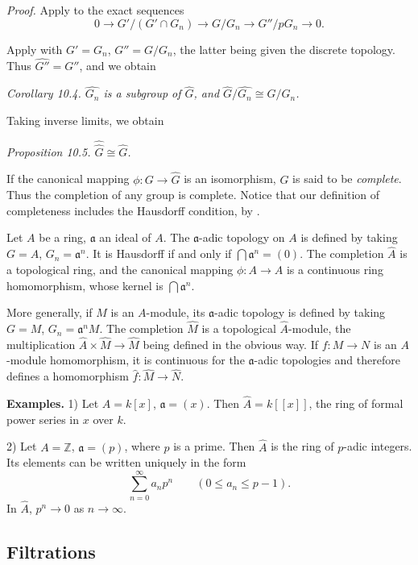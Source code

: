 \noindent\textit{Proof.} Apply  to the exact sequences
\[
0\longrightarrow G'/(G'\cap G_n)\longrightarrow G/G_n\longrightarrow G''/pG_n\longrightarrow0.
\]
\proofbox

Apply  with $G'=G_n$, $G''=G/G_n$, the latter being given the discrete topology. Thus $\widehat{G''}=G''$, and we obtain

\noindent\textit{Corollary 10.4. $\widehat{G_n}$ is a subgroup of $\widehat G$, and $\widehat G/\widehat{G_n}\cong G/G_n$.} \proofbox

Taking inverse limits, we obtain

\noindent\textit{Proposition 10.5. $\widehat{\widehat G}\cong\widehat G$.} \proofbox

If the canonical mapping $\phi:G\longrightarrow\widehat G$ is an isomorphism, $G$ is said to be \textit{complete}. Thus the completion of any group is complete. Notice that our definition of completeness includes the Hausdorff condition, by .

Let $A$ be a ring, $\mathfrak a$ an ideal of $A$. The $\mathfrak a$-adic topology on $A$ is defined by taking $G=A$, $G_n=\mathfrak a^n$. It is Hausdorff if and only if $\bigcap\mathfrak a^n=(0)$. The completion $\widehat A$ is a topological ring, and the canonical mapping $\phi:A\longrightarrow\widehat A$ is a continuous ring homomorphism, whose kernel is $\bigcap\mathfrak a^n$.

More generally, if $M$ is an $A$-module, its $\mathfrak a$-adic topology is defined by taking $G=M$, $G_n=\mathfrak a^nM$. The completion $\widehat M$ is a topological $\widehat A$-module, the multiplication $\widehat A\times\widehat M\longrightarrow\widehat M$ being defined in the obvious way. If $f:M\longrightarrow N$ is an $A$-module homomorphism, it is continuous for the $\mathfrak a$-adic topologies and therefore defines a homomorphism $\widehat f:\widehat M\longrightarrow\widehat N$.

\noindent\textbf{Examples.} 1) Let $A=k[x]$, $\mathfrak a=(x)$. Then $\widehat A=k[[x]]$, the ring of formal power series in $x$ over $k$.

2) Let $A=\mathbb Z$, $\mathfrak a=(p)$, where $p$ is a prime. Then $\widehat A$ is the ring of $p$-adic integers. Its elements can be written uniquely in the form
\[
\sum_{n=0}^{\infty}a_np^n\qquad(0\leq a_n\leq p-1).
\]
In $\widehat A$, $p^n\longrightarrow0$ as $n\longrightarrow\infty$.

\subsection{Filtrations}

